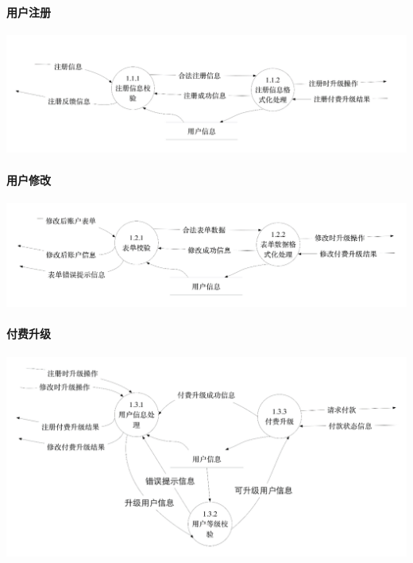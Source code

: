 \paragraph{用户注册}
\begin{center}
    \includegraphics[width=1\linewidth]{img/1.1.png}
\end{center}
\paragraph{用户修改}
\begin{center}
    \includegraphics[width=1\linewidth]{img/1.2.png}
\end{center}
\paragraph{付费升级}
\begin{center}
    \includegraphics[width=1\linewidth]{img/1.3.png}
\end{center}
